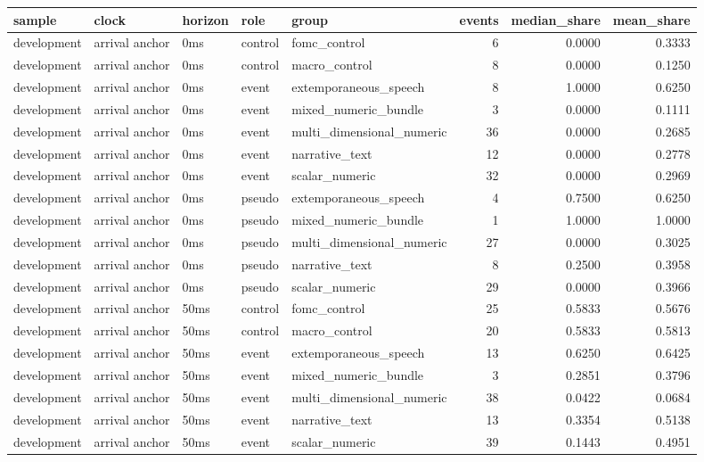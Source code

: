 \begin{tabular}{lllllrrr}
\toprule
sample & clock & horizon & role & group & events & median_share & mean_share \\
\midrule
development & arrival anchor & 0ms & control & fomc_control & 6 & 0.0000 & 0.3333 \\
development & arrival anchor & 0ms & control & macro_control & 8 & 0.0000 & 0.1250 \\
development & arrival anchor & 0ms & event & extemporaneous_speech & 8 & 1.0000 & 0.6250 \\
development & arrival anchor & 0ms & event & mixed_numeric_bundle & 3 & 0.0000 & 0.1111 \\
development & arrival anchor & 0ms & event & multi_dimensional_numeric & 36 & 0.0000 & 0.2685 \\
development & arrival anchor & 0ms & event & narrative_text & 12 & 0.0000 & 0.2778 \\
development & arrival anchor & 0ms & event & scalar_numeric & 32 & 0.0000 & 0.2969 \\
development & arrival anchor & 0ms & pseudo & extemporaneous_speech & 4 & 0.7500 & 0.6250 \\
development & arrival anchor & 0ms & pseudo & mixed_numeric_bundle & 1 & 1.0000 & 1.0000 \\
development & arrival anchor & 0ms & pseudo & multi_dimensional_numeric & 27 & 0.0000 & 0.3025 \\
development & arrival anchor & 0ms & pseudo & narrative_text & 8 & 0.2500 & 0.3958 \\
development & arrival anchor & 0ms & pseudo & scalar_numeric & 29 & 0.0000 & 0.3966 \\
development & arrival anchor & 50ms & control & fomc_control & 25 & 0.5833 & 0.5676 \\
development & arrival anchor & 50ms & control & macro_control & 20 & 0.5833 & 0.5813 \\
development & arrival anchor & 50ms & event & extemporaneous_speech & 13 & 0.6250 & 0.6425 \\
development & arrival anchor & 50ms & event & mixed_numeric_bundle & 3 & 0.2851 & 0.3796 \\
development & arrival anchor & 50ms & event & multi_dimensional_numeric & 38 & 0.0422 & 0.0684 \\
development & arrival anchor & 50ms & event & narrative_text & 13 & 0.3354 & 0.5138 \\
development & arrival anchor & 50ms & event & scalar_numeric & 39 & 0.1443 & 0.4951 \\

\end{tabular}
